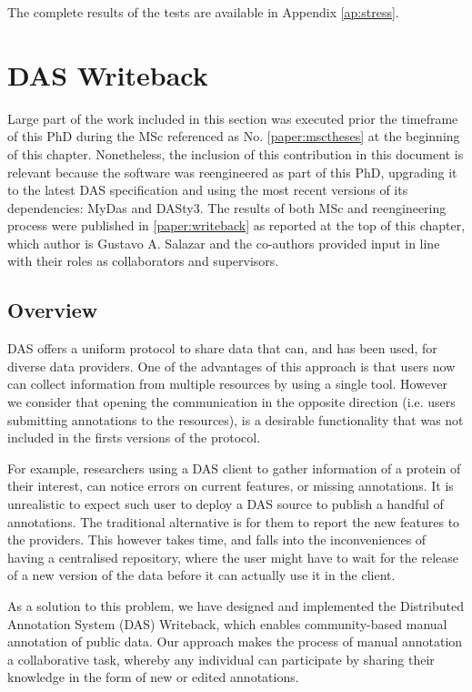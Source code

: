 The complete results of the tests are available in Appendix \ref{ap:stress}.










\section{DAS Writeback}\label{section:writeback}

Large part of the work included in this section was executed prior the timeframe of this PhD during the MSc referenced as No. \ref{paper:msctheses} at the beginning of this chapter. Nonetheless, the inclusion of this contribution in this document is relevant because the software was reengineered as part of this PhD, upgrading it to the latest DAS specification and using the most recent versions of its dependencies: MyDas and DASty3. The results of both MSc and reengineering process were published in \ref{paper:writeback} as reported at the top of this chapter, which author is Gustavo A. Salazar and the co-authors provided input in line with their roles as collaborators and supervisors. 

\subsection{Overview}
DAS offers a uniform protocol to share data that can, and has been used, for diverse data providers. One of the advantages of this approach is that users now can collect information from multiple resources by using a single tool. However we consider that opening the communication in the opposite direction (i.e. users submitting annotations to the resources), is a desirable functionality that was not included in the firsts versions of the protocol.

For example, researchers using a DAS client to gather information of a protein of their interest, can notice errors on current features, or missing annotations. It is unrealistic to expect such user to deploy a DAS source to publish a handful of annotations. The traditional alternative is for them to report the new features to the providers. This however takes time, and falls into the inconveniences of having a centralised repository, where the user might have to wait for the release of a new version of the data before it can actually use it in the client.

As a solution to this problem, we have designed and implemented the Distributed Annotation System (DAS) Writeback, which enables community-based manual annotation of public data. Our approach makes the process of manual annotation a collaborative task, whereby any individual can participate by sharing their knowledge in the form of new or edited annotations.

